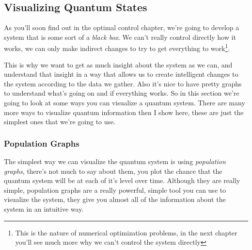 \documentclass[english, a4paper, 12pt, twoside]{article}
\numberwithin{equation}{section} %
\begin{document}
\subsection{Visualizing Quantum States}
As you'll soon find out in the optimal control chapter, we're going to develop a system that is some sort of a \textit{black box}. We can't really control directly how it works, we can only make indirect changes to try to get everything to work\footnote{This is the nature of numerical optimization problems, in the next chapter you'll see much more why we can't control the system directly}.

This is why we want to get as much insight about the system as we can, and understand that insight in a way that allows us to create intelligent changes to the system according to the data we gather. Also it's nice to have pretty graphs to understand what's going on and if everything works. So in this section we're going to look at some ways you can visualize a quantum system. There are many more ways to visualize quantum information then I show here, these are just the simplest ones that we're going to use.

\subsubsection{Population Graphs}
The simplest way we can visualize the quantum system is using \textit{population graphs}, there's not much to say about them, you plot the chance that the quantum system will be at each of it's level over time. Although they are really simple, population graphs are a really powerful, simple tool you can use to visualize the system, they give you almost all of the information about the system in an intuitive way.
\end{document}
